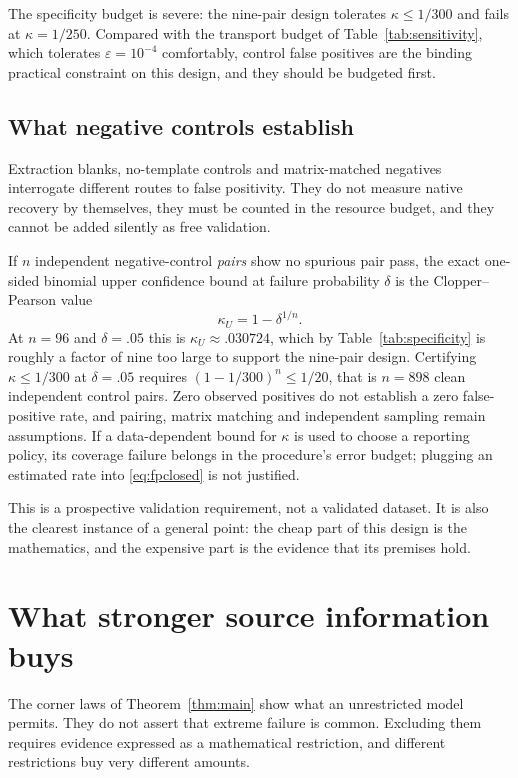 \documentclass[11pt]{article}
\theoremstyle{remark}\newtheorem{remark}[theorem]{Remark}
\begin{document}
The specificity budget is severe: the nine-pair design tolerates
$\kappa\le1/300$ and fails at $\kappa=1/250$. Compared with the transport budget
of Table~\ref{tab:sensitivity}, which tolerates $\varepsilon=10^{-4}$
comfortably, control false positives are the binding practical constraint on
this design, and they should be budgeted first.

\subsection{What negative controls establish}
Extraction blanks, no-template controls and matrix-matched negatives interrogate
different routes to false positivity. They do not measure native recovery by
themselves, they must be counted in the resource budget, and they cannot be added
silently as free validation.

If $n$ independent negative-control \emph{pairs} show no spurious pair pass, the
exact one-sided binomial upper confidence bound at failure probability $\delta$
is the Clopper--Pearson value \cite{clopper1934}
\begin{equation}\label{eq:cp}
\kappa_U=1-\delta^{1/n}.
\end{equation}
At $n=96$ and $\delta=.05$ this is $\kappa_U\approx.030724$, which by
Table~\ref{tab:specificity} is roughly a factor of nine too large to support the
nine-pair design. Certifying $\kappa\le1/300$ at $\delta=.05$ requires
$(1-1/300)^n\le1/20$, that is $n=898$ clean independent control pairs. Zero
observed positives do not establish a zero false-positive rate, and pairing,
matrix matching and independent sampling remain assumptions. If a data-dependent
bound for $\kappa$ is used to choose a reporting policy, its coverage failure
belongs in the procedure's error budget; plugging an estimated rate into
\eqref{eq:fpclosed} is not justified.

This is a prospective validation requirement, not a validated dataset. It is also
the clearest instance of a general point: the cheap part of this design is the
mathematics, and the expensive part is the evidence that its premises hold.

\section{What stronger source information buys}\label{sec:constrained}
The corner laws of Theorem~\ref{thm:main} show what an unrestricted model
permits. They do not assert that extreme failure is common. Excluding them
requires evidence expressed as a mathematical restriction, and different
restrictions buy very different amounts.
\end{document}
